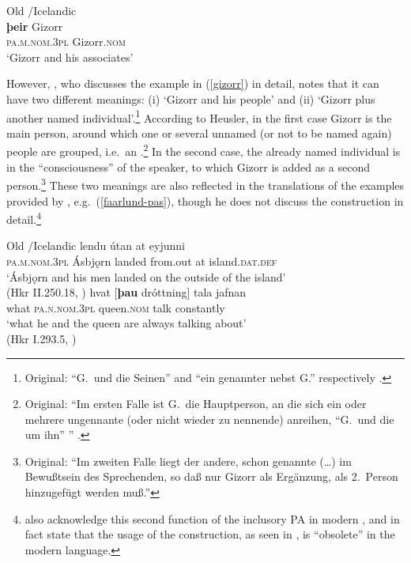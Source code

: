 \documentclass[output=paper,colorlinks,citecolor=brown]{langscibook}
\begin{document}
\ea \label{gizorr} Old /Icelandic\\
\gll \textbf{þeir} Gizorr\\
\textsc{pa.m.nom.3pl} Gizorr.\textsc{nom}\\
\glt `Gizorr and his associates' \citep[ex. (4)]{wals-36}
\z

However, \citet[§404]{heusler1962altislandisches}, who discusses the example in (\ref{gizorr}) in detail, notes that it can have two different meanings: (i) `Gizorr and his people' and (ii) `Gizorr plus another named individual'.\footnote{Original: ``G.~und die Seinen'' and ``ein genannter nebst G.'' respectively \citep[§404]{heusler1962altislandisches}.}  According to Heusler, in the first case Gizorr is the main person, around which one or several unnamed (or not to be named again) people are grouped, i.e.~an .\footnote{Original: ``Im ersten Falle ist G.~die Hauptperson, an die sich ein oder mehrere ungennante (oder nicht wieder zu nennende) anreihen, ``G.~und die um ihn'' '' \citep[§404]{heusler1962altislandisches}.} In the second case, the already named individual is in the ``consciousness'' of the speaker, to which Gizorr is added as a second person.\footnote{\label{heusler-fn}Original: ``Im zweiten Falle liegt der andere, schon genannte (\dots) im Bewußtsein des Sprechenden, so daß nur Gizorr als Ergänzung, als 2.~Person hinzugefügt werden muß.''} 
These two meanings are also reflected in the translations of the examples provided by \citet[90]{Faarlund04}, e.g.~(\ref{faarlund-pas}), though he does not discuss the construction in detail.\footnote{\citet[9]{sigurdhsson2020we} also acknowledge this second function of the inclusory PA in modern , and in fact state that the  usage of the construction, as seen in , is ``obsolete'' in the modern language.} 

\ea \label{faarlund-pas} Old /Icelandic
\ea {} lendu útan at eyjunni\\
\textsc{pa.m.nom.3pl} Ásbj{\k{o}}rn landed from.out at island.\textsc{dat.def} \\
\glt `Ásbj{\k{o}}rn and his men landed on the outside of the island'\\ 
(Hkr II.250.18, \citealp[90]{Faarlund04})
\ex \gll hvat [\textbf{þau} dróttning] tala jafnan\\
what \textsc{pa.n.nom.3pl} queen.\textsc{nom} talk constantly \\
\glt `what he and the queen are always talking about'\\
 (Hkr I.293.5, \citealp[90]{Faarlund04})
\z 
\z 
\end{document}
